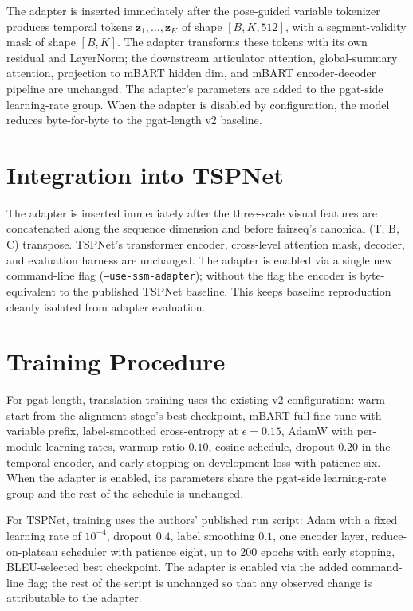 The adapter is inserted immediately after the pose-guided variable tokenizer produces temporal tokens $\mathbf{z}_1, \ldots, \mathbf{z}_K$ of shape $[B, K, 512]$, with a segment-validity mask of shape $[B, K]$. The adapter transforms these tokens with its own residual and LayerNorm; the downstream articulator attention, global-summary attention, projection to mBART hidden dim, and mBART encoder-decoder pipeline are unchanged. The adapter's parameters are added to the pgat-side learning-rate group. When the adapter is disabled by configuration, the model reduces byte-for-byte to the pgat-length v2 baseline.

\section{Integration into TSPNet}

The adapter is inserted immediately after the three-scale visual features are concatenated along the sequence dimension and before fairseq's canonical (T, B, C) transpose. TSPNet's transformer encoder, cross-level attention mask, decoder, and evaluation harness are unchanged. The adapter is enabled via a single new command-line flag (\texttt{--use-ssm-adapter}); without the flag the encoder is byte-equivalent to the published TSPNet baseline. This keeps baseline reproduction cleanly isolated from adapter evaluation.

\section{Training Procedure}

For pgat-length, translation training uses the existing v2 configuration: warm start from the alignment stage's best checkpoint, mBART full fine-tune with variable prefix, label-smoothed cross-entropy at $\epsilon = 0.15$, AdamW with per-module learning rates, warmup ratio $0.10$, cosine schedule, dropout $0.20$ in the temporal encoder, and early stopping on development loss with patience six. When the adapter is enabled, its parameters share the pgat-side learning-rate group and the rest of the schedule is unchanged.

For TSPNet, training uses the authors' published run script: Adam with a fixed learning rate of $10^{-4}$, dropout $0.4$, label smoothing $0.1$, one encoder layer, reduce-on-plateau scheduler with patience eight, up to $200$ epochs with early stopping, BLEU-selected best checkpoint. The adapter is enabled via the added command-line flag; the rest of the script is unchanged so that any observed change is attributable to the adapter.

